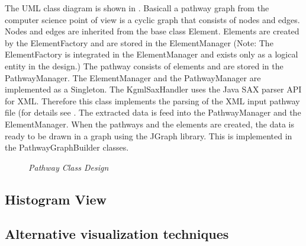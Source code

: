 The UML class diagram is shown in .
Basicall a pathway graph from the computer science point of view is a cyclic graph that consists of nodes and edges.
Nodes and edges are inherited from the base class Element.
Elements are created by the ElementFactory and are stored in the ElementManager (Note: The ElementFactory is integrated in the
ElementManager and exists only as a logical entity in the design.) 
The pathway consists of elements and are stored in the PathwayManager.
The ElementManager and the PathwayManager are implemented as a Singleton. 
The KgmlSaxHandler uses the Java SAX parser API for XML. Therefore this class implements the parsing of the XML input pathway file (for details see . The extracted data is feed into the PathwayManager and the ElementManager.
When the pathways and the elements are created, the data is ready to be drawn in a graph using the JGraph library.
This is implemented in the PathwayGraphBuilder classes.

\begin{figure}[ht]
\centering
{} 
\caption[Pathway Class Design]{\textit{Pathway Class Design}} 
\label{gfx:pathway_class_design}
\end{figure}

\subsection{Histogram View}

\subsection{Alternative visualization techniques}

